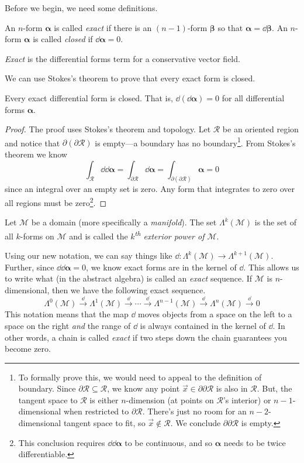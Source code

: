 Before we begin, we need some definitions.
\begin{definition}
	An $n$-form $\bm\alpha$ is called \emph{exact} if there is an
	$(n-1)$-form $\bm\beta$ so that $\bm\alpha=\dd \bm\beta$.  An $n$-form
	$\bm\alpha$ is called \emph{closed} if $\dd \bm\alpha=0$.
\end{definition}
\emph{Exact} is the differential forms term for a conservative vector field.

We can use Stokes's theorem to prove that every exact form is closed.
\begin{theorem}
	Every exact differential form is closed.  That is, $\dd (\dd \bm\alpha)=0$
	for all differential forms $\bm\alpha$.
\end{theorem}
\begin{proof}
	The proof uses Stokes's theorem and topology.  Let $\mathcal R$
	be an oriented region and notice that $\partial (\partial \mathcal R)$ is
	empty---a boundary has no boundary\footnote{
		To formally prove this, we would need to appeal to the definition
		of boundary.  Since $\partial \mathcal R\subseteq \mathcal R$, 
		we know any point $\vec x\in\partial \partial \mathcal R$ is also in $\mathcal R$.
		But, the tangent space to $\mathcal R$ is either $n$-dimension (at points on
		$\mathcal R$'s interior) or $n-1$-dimensional when restricted to $\partial \mathcal R$.
		There's just no room for an $n-2$-dimensional tangent space to fit, so $\vec x\notin\mathcal R$.
		We conclude $\partial\partial \mathcal R$ is empty.
	}.
	From Stokes's theorem we know
	\[
		\int_{\mathcal R}\dd \dd \bm\alpha
		=
		\int_{\partial \mathcal R}\dd \bm\alpha
		=
		\int_{\partial (\partial \mathcal R)}\bm\alpha
		=0
	\]
	since an integral over an empty set is zero.  Any form that integrates to zero over
	all regions must be zero\footnote{ This conclusion requires $\dd \dd\bm\alpha$
	to be continuous, and so $\bm\alpha$ needs to be twice differentiable.}.
\end{proof}

\begin{definition}
	Let $\mathcal M$ be a domain (more specifically a \emph{manifold}).
	The set $\Lambda^k(\mathcal M)$ is the set of all $k$-forms on $\mathcal M$
	and is called the \emph{$k$\textsuperscript{th} exterior power of $\mathcal M$}.
\end{definition}

Using our new notation, we can say things like $\dd:\Lambda^k(\mathcal M)\to \Lambda^{k+1}(\mathcal M)$.
Further, since $\dd\dd \bm\alpha=0$, we know exact forms are in the kernel of $\dd$.
This allows us to write what (in the abstract algebra) is called an \emph{exact} sequence.
If $\mathcal M$ is $n$-dimensional, then we have the following exact sequence.
\[
	\Lambda^0(\mathcal M) \xrightarrow{\dd}
	\Lambda^1(\mathcal M)\xrightarrow{\dd} \cdots 
	\xrightarrow{\dd} 
	\Lambda^{n-1}(\mathcal M)\xrightarrow{\dd}  
	\Lambda^{n}(\mathcal M)\xrightarrow{\dd}  0
\]
This notation means that the map $\dd$ moves objects from a space on the left
to a space on the right \emph{and} the range of $\dd$ is always contained in the
kernel of $\dd$.  In other words, a chain is called \emph{exact} if two
steps down the chain guarantees you become zero.

